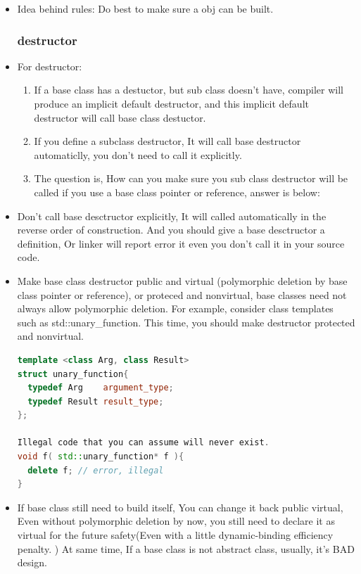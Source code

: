 \documentclass[a4paper,12pt,twoside]{book}
\begin{document}
\begin{itemize}
\item Idea behind rules: Do best to make sure a obj can be built.



\subsubsection{destructor}
\item For destructor:
\begin{enumerate}
\item If a base class has a destuctor, but sub class doesn't have,  compiler will produce an implicit default destructor, and this implicit default destructor will call base class destuctor.
\item If you define a subclass destructor, It will call base destructor automaticlly, you don't need to call it explicitly.
\item The question is, How can you make sure you sub class destructor will be called if you use a base class pointer or reference, answer is below:
\end{enumerate}

\item Don't call base desctructor explicitly, It will called automatically in the reverse order of construction.  And you should give a base desctructor a definition, Or linker will report error it even you don't call it in your source code.

\item Make base class destructor public and virtual (polymorphic deletion by base class pointer or reference), or proteced and nonvirtual, base classes need not always allow polymorphic deletion. For example, consider class templates such as std::unary\_function. This time, you should make destructor protected and nonvirtual.
 \begin{lstlisting}[frame=single, language=c++]
template <class Arg, class Result>
struct unary_function{
  typedef Arg    argument_type;
  typedef Result result_type;
};

Illegal code that you can assume will never exist.
void f( std::unary_function* f ){
  delete f; // error, illegal
}
\end{lstlisting}

\item If base class still need to build itself, You can change it back public virtual,  Even without polymorphic deletion by now, you still need to declare it as virtual for the future safety(Even with a little dynamic-binding efficiency penalty. ) At same time, If a base class is not abstract class, usually, it's BAD design.


\end{itemize}
\end{document}
